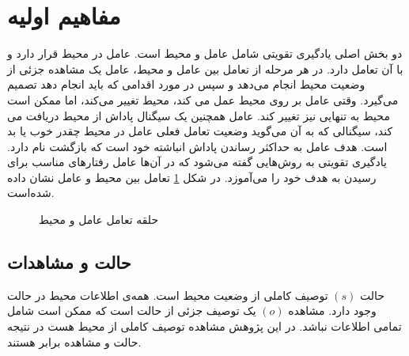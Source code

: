 \section{مفاهیم اولیه}\label{sec:RL_concept}
دو بخش اصلی یادگیری تقویتی
شامل عامل
 و محیط
  است. عامل در محیط قرار دارد و با آن تعامل دارد.
  در هر مرحله از تعامل بین عامل و محیط، عامل یک مشاهده جزئی از وضعیت محیط انجام می‌دهد و سپس در مورد اقدامی که باید انجام دهد تصمیم می‌گیرد. وقتی عامل بر روی محیط عمل می کند، محیط تغییر می‌کند، اما ممکن است محیط به تنهایی نیز تغییر کند.
  عامل همچنین یک سیگنال پاداش
   از محیط دریافت می کند، سیگنالی که به آن می‌گوید وضعیت تعامل فعلی عامل  در محیط چقدر خوب یا بد است. هدف عامل به حداکثر رساندن پاداش انباشته خود است که بازگشت
    نام دارد. یادگیری تقویتی به روش‌هایی گفته می‌شود که در آن‌ها عامل رفتارهای مناسب برای رسیدن به هدف خود را می‌آموزد. در شکل
    \ref{fig:agent_env}
    تعامل بین محیط و عامل نشان داده شده‌است.
\begin{figure}[H]
	\begin{center}
	\end{center}
	\caption{حلقه تعامل عامل و محیط}
	\label{fig:agent_env}
\end{figure}
\subsection{حالت و مشاهدات}
حالت
\((s)\)
 توصیف کاملی از وضعیت محیط است. همه‌ی اطلاعات محیط در حالت وجود دارد. مشاهده
 \((o)\)
  یک توصیف جزئی از حالت است که ممکن است شامل تمامی اطلاعات نباشد. در این پژوهش مشاهده توصیف کاملی از محیط هست در نتیجه حالت و مشاهده برابر هستند.
